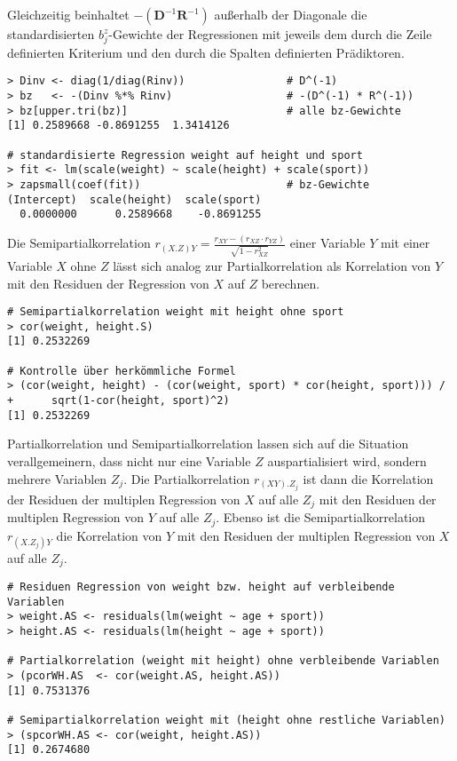 Gleichzeitig beinhaltet $-(\bm{D}^{-1} \bm{R}^{-1})$ außerhalb der Diagonale die standardisierten $b_{j}^{z}$-Gewichte der Regressionen mit jeweils dem durch die Zeile definierten Kriterium und den durch die Spalten definierten Prädiktoren.
\begin{lstlisting}
> Dinv <- diag(1/diag(Rinv))                # D^(-1)
> bz   <- -(Dinv %*% Rinv)                  # -(D^(-1) * R^(-1))
> bz[upper.tri(bz)]                         # alle bz-Gewichte
[1] 0.2589668 -0.8691255  1.3414126

# standardisierte Regression weight auf height und sport
> fit <- lm(scale(weight) ~ scale(height) + scale(sport))
> zapsmall(coef(fit))                       # bz-Gewichte
(Intercept)  scale(height)  scale(sport)
  0.0000000      0.2589668    -0.8691255
\end{lstlisting}

Die Semipartialkorrelation $r_{(X.Z)Y} = \frac{r_{XY} - (r_{XZ} \cdot r_{YZ})}{\sqrt{1-r_{XZ}^{2}}}$ einer Variable $Y$ mit einer Variable $X$ ohne $Z$ lässt sich analog zur Partialkorrelation als Korrelation von $Y$ mit den Residuen der Regression von $X$ auf $Z$ berechnen.
\begin{lstlisting}
# Semipartialkorrelation weight mit height ohne sport
> cor(weight, height.S)
[1] 0.2532269

# Kontrolle über herkömmliche Formel
> (cor(weight, height) - (cor(weight, sport) * cor(height, sport))) /
+      sqrt(1-cor(height, sport)^2)
[1] 0.2532269
\end{lstlisting}

Partialkorrelation und Semipartialkorrelation lassen sich auf die Situation verallgemeinern, dass nicht nur eine Variable $Z$ auspartialisiert wird, sondern mehrere Variablen $Z_{j}$. Die Partialkorrelation $r_{(XY).Z_{j}}$ ist dann die Korrelation der Residuen der multiplen Regression von $X$ auf alle $Z_{j}$ mit den Residuen der multiplen Regression von $Y$ auf alle $Z_{j}$. Ebenso ist die Semipartialkorrelation $r_{(X.Z_{j})Y}$ die Korrelation von $Y$ mit den Residuen der multiplen Regression von $X$ auf alle $Z_{j}$.
\begin{lstlisting}
# Residuen Regression von weight bzw. height auf verbleibende Variablen
> weight.AS <- residuals(lm(weight ~ age + sport))
> height.AS <- residuals(lm(height ~ age + sport))

# Partialkorrelation (weight mit height) ohne verbleibende Variablen
> (pcorWH.AS  <- cor(weight.AS, height.AS))
[1] 0.7531376

# Semipartialkorrelation weight mit (height ohne restliche Variablen)
> (spcorWH.AS <- cor(weight, height.AS))
[1] 0.2674680
\end{lstlisting}

